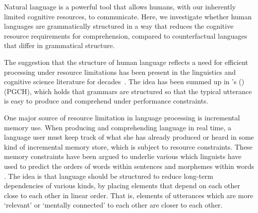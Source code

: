 
Natural language is a powerful tool that allows humans, with our inherently limited cognitive resources, to communicate.
Here, we investigate whether human languages are grammatically structured in a way that reduces the cognitive resource requirements for comprehension, compared to counterfactual languages that differ in grammatical structure.

The suggestion that the structure of human language reflects a need for efficient processing under resource limitations has been present in the linguistics and cognitive science literature for decades~\citep{yngve1960model,berwick1984grammatical,hawkins1994performance,chomsky2005three,jaeger2011language,gibson2019efficiency,hahn2020universals}. The idea has been summed up in \citeauthor{hawkins2004efficiency}'s (\citeyear{hawkins2004efficiency})  (PGCH), which holds that grammars are structured so that the typical utterance is easy to produce and comprehend under performance constraints.

One major source of resource limitation in language processing is incremental memory use. 
When producing and comprehending language in real time, a language user must keep track of what she has already produced or heard in some kind of incremental memory store, which is subject to resource constraints.
These memory constraints have been argued to underlie various  which linguists have used to predict the orders of words within sentences and morphemes within words \citep[e.g.][]{behaghel1932deutsche,givon1985iconicity,bybee-morphology-1985,rijkhoff-explaining-1990,hawkins1994performance,hawkins2004efficiency,hawkins2014crosslinguistic,temperley-minimizing-2018}.
The idea is that language should be structured to reduce long-term dependencies of various kinds, by placing elements that depend on each other close to each other in linear order.
That is, elements of utterances which are more `relevant' or `mentally connected' to each other are closer to each other.

